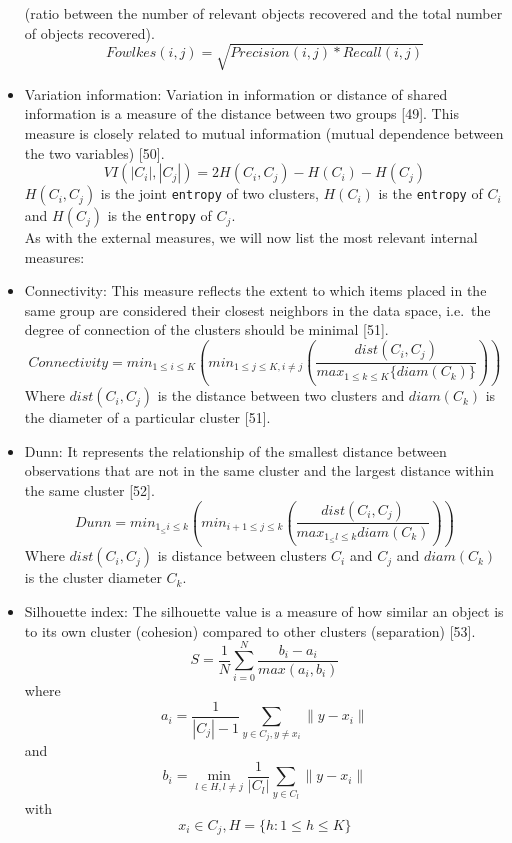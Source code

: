 \documentclass[
]{article}
\begin{document}
\begin{itemize}
  (ratio between the number of relevant objects recovered and the total
  number of objects recovered). \begin{equation}
        Fowlkes(i,j) = \sqrt{Precision(i,j) * Recall(i,j)}
    \end{equation}
\item
  Variation information: Variation in information or distance of shared
  information is a measure of the distance between two groups {[}49{]}.
  This measure is closely related to mutual information (mutual
  dependence between the two variables) {[}50{]}. \begin{equation}
       VI(|C_{i}|,|C_{j}|) = 2H(C_{i},C_{j}) - H(C_{i}) - H(C_{j})
    \end{equation} \(H(C_{i},C_{j})\) is the joint \texttt{entropy} of
  two clusters, \(H(C_{i})\) is the \texttt{entropy} of \(C_{i}\) and
  \(H(C_{j})\) is the \texttt{entropy} of \(C_{j}\).\\
  As with the external measures, we will now list the most relevant
  internal measures:
\item
  Connectivity: This measure reflects the extent to which items placed
  in the same group are considered their closest neighbors in the data
  space, i.e.~the degree of connection of the clusters should be minimal
  {[}51{]}. \begin{equation}
        Connectivity = min_{ 1\leq i \leq K} \left( min_{1\leq j \leq K, i\not= j} \left( \frac{dist(C_i,C_j)}{max_{1\leq k \leq K} \lbrace diam(C_k) \rbrace }  \right) \right)
    \end{equation} Where \(dist(C_i,C_j)\) is the distance between two
  clusters and \(diam(C_k)\) is the diameter of a particular cluster
  {[}51{]}.
\item
  Dunn: It represents the relationship of the smallest distance between
  observations that are not in the same cluster and the largest distance
  within the same cluster {[}52{]}. \begin{equation}
    Dunn =  min_{1_\leq i\leq k} \left( min_{i+1\leq j \leq k}  \left( \frac{dist(C_i,C_j)}{max_{1_\leq l \leq k} diam(C_{k})} \right) \right)
    \end{equation} Where \(dist(C_{i},C_{j})\) is distance between
  clusters \(C_{i}\) and \(C_{j}\) and \(diam(C_{k})\) is the cluster
  diameter \(C_{k}\).\\
\item
  Silhouette index: The silhouette value is a measure of how similar an
  object is to its own cluster (cohesion) compared to other clusters
  (separation) {[}53{]}. \begin{equation}
        S = \frac{1}{N}\sum_{i=0}^{N}\frac{b_{i} - a_{i}}{max(a_{i},b_{i})}
    \end{equation} where
  \[a_{i}=\frac{1}{|C_{j}| - 1} \sum_{y\in C_{j},y\neq x_{i}}^{}\|y-x_{i}\|\]
  and
  \[ b_{i} = \min\limits_{l \in H, l\neq j}^{} \frac{1}{|C_{l}|} \sum_{y \in C_{l}}^{} \| y - x_{i} \| \]
  with \[ x_{i} \in C_{j}, H = \{h: 1 \leq h \leq K\}\]
\end{itemize}
\end{document}
